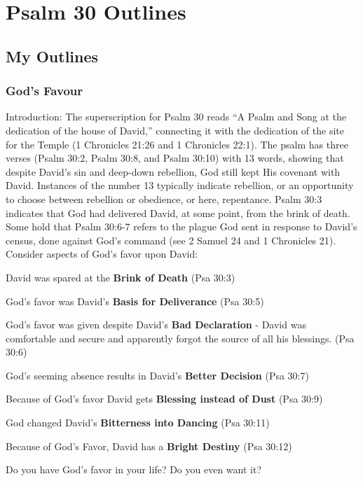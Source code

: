 \section{Psalm 30 Outlines}

\subsection{My Outlines}

\subsubsection{God's Favour}
Introduction: The superscription for Psalm 30 reads ``A Psalm and Song at the dedication of the house of David,'' connecting it with the dedication of the site for the Temple (1 Chronicles 21:26 and 1 Chronicles 22:1). The psalm has three verses (Psalm 30:2, Psalm 30:8, and Psalm 30:10) with 13 words, showing that despite David's sin and deep-down rebellion, God still kept His covenant with David. Instances of the number 13 typically indicate rebellion, or an opportunity to choose between rebellion or obedience, or here, repentance. Psalm 30:3 indicates that God had delivered David, at some point, from the brink of death. Some hold that Psalm 30:6-7 refers to the plague God sent in response to David's census, done against God's command (see 2 Samuel 24 and 1 Chronicles 21). Consider aspects of God's favor upon David:
\begin{compactenum}
    \item David was spared at the \textbf{Brink of Death}  (Psa 30:3)
    \item God's favor was David's \textbf{Basis for Deliverance}  (Psa 30:5)
    \item God's favor was given despite David's \textbf{Bad Declaration} - David was comfortable and secure and apparently forgot the source of all his blessings.  (Psa 30:6)
    \item God's seeming absence results in David's \textbf{Better Decision}   (Psa 30:7)
    \item Because of God's favor David gets \textbf{Blessing instead of Dust}  (Psa 30:9)
    \item God changed David's \textbf{Bitterness into Dancing}  (Psa 30:11)
    \item Because of God's Favor, David has a \textbf{Bright Destiny}  (Psa 30:12)\\
\end{compactenum}
Do you have God's favor in your life? Do you even want it?

